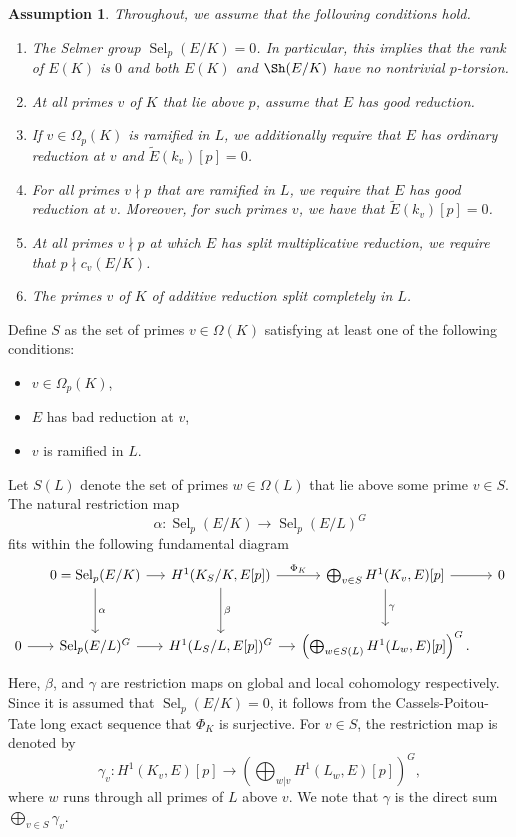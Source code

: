 \documentclass[12pt]{amsart}
\newtheorem{ass}[theorem]{Assumption}
\newcommand{\op}[1]{\operatorname{#1}}
\numberwithin{equation}{section}
\begin{document}
\begin{ass}\label{ass on good reduction at v in S}
Throughout, we assume that the following conditions hold.
\begin{enumerate}
    \item The Selmer group $\op{Sel}_p(E/K)=0$. In particular, this implies that the rank of $E(K)$ is $0$ and both $E(K)$ and $\Sh(E/K)$ have no nontrivial $p$-torsion.
    \item At all primes $v$ of $K$ that lie above $p$, assume that $E$ has good reduction. 
    \item If $v\in \Omega_p(K)$ is ramified in $L$, we additionally require that $E$ has ordinary reduction at $v$ and $\widetilde{E}(k_v)[p]=0$.
    \item For all primes $v\nmid p$ that are ramified in $L$, we require that $E$ has good reduction at $v$. Moreover, for such primes $v$, we have that $\widetilde{E}(k_v)[p]=0$.
    \item At all primes $v\nmid p$ at which $E$ has split multiplicative reduction, we require that $p\nmid c_v(E/K)$.
    \item The primes $v$ of $K$ of additive reduction split completely in $L$.
\end{enumerate}

\end{ass}
Define $S$ as the set of primes $v\in \Omega(K)$ satisfying at least one of the following conditions:
\begin{itemize}
    \item $v\in \Omega_p(K)$,
    \item $E$ has bad reduction at $v$,
    \item $v$ is ramified in $L$.
\end{itemize}
Let $S(L)$ denote the set of primes $w\in \Omega(L)$ that lie above some prime $v\in S$. The natural restriction map 
\[\alpha: \op{Sel}_p(E/K)\rightarrow \op{Sel}_p(E/L)^G\] fits within the following fundamental diagram
 \begin{equation}\label{fdiagram}
\begin{tikzcd}[column sep = small, row sep = large]
& 0=\op{Sel}_p(E/K) \arrow{r}\arrow{d}{\alpha} & H^1(K_S/K, E[p])\arrow{r}{\Phi_{K}} \arrow{d}{\beta} & \bigoplus_{v\in S} H^1(K_v, E)[p] \arrow{d}{\gamma}  \arrow{r} & 0\\
0\arrow{r} & \op{Sel}_p(E/L)^G\arrow{r} & H^1(L_S/L, E[p])^G\arrow{r}  &\left(\bigoplus_{w\in S(L)} H^1(L_w, E)[p]\right)^G.
\end{tikzcd}
\end{equation}
Here, $\beta$, and $\gamma$ are restriction maps on global and local cohomology respectively. Since it is assumed that $\op{Sel}_p(E/K)=0$, it follows from the Cassels-Poitou-Tate long exact sequence that $\Phi_K$ is surjective. For $v\in S$, the restriction map is denoted by
\[\gamma_v: H^1(K_v, E)[p]\rightarrow \left(\bigoplus_{w|v} H^1(L_w, E)[p]\right)^G,\] where $w$ runs through all primes of $L$ above $v$. We note that $\gamma$ is the direct sum $\bigoplus_{v\in S} \gamma_v$.
\end{document}
